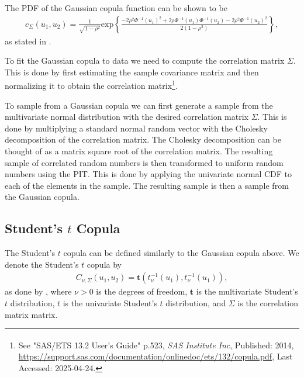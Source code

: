 \documentclass[%
a4paper,							
11pt,								
bibliography=totoc,						
abstracton=true					
]
{scrartcl}
\theoremstyle{plain}
\theoremstyle{definition}
\theoremstyle{remark}
\newcommand{\1}{\mathbbm{1}}
\begin{document}
The \gls{PDF} of the Gaussian copula function can be shown to be 
\begin{align*}
     c_{\Sigma} (u_1,u_2)
    = \frac{1}{\sqrt{1-\rho^2}} \mathrm{exp}\left\{  \frac{-2\rho^2\Phi^{-1}(u_1)^2  +2\rho \Phi^{-1}(u_1)\Phi^{-1}(u_2) -2\rho^2\Phi^{-1}(u_2)^2}{2(1-\rho^2)}   \right\},
\end{align*}
as stated in \citet[p.267]{Alexander2008}.



To fit the Gaussian copula to data we need to compute the correlation matrix $\Sigma$. This is done by first estimating the sample covariance matrix and then normalizing it to obtain the correlation matrix\footnote{See "SAS/ETS\textsuperscript{\textregistered} 13.2 User's Guide" p.523, \textit{SAS Institute Inc}, Published: 2014, \url{https://support.sas.com/documentation/onlinedoc/ets/132/copula.pdf}, Last Accessed: 2025-04-24.}.%

To sample from a Gaussian copula we can first generate a sample from the multivariate normal distribution with the desired correlation matrix $\Sigma$. This is done by multiplying a standard normal random vector with the Cholesky decomposition of the correlation matrix. The Cholesky decomposition can be thought of as a matrix square root of the correlation matrix. The resulting sample of correlated random numbers is then transformed to uniform random numbers using the \gls{PIT}. This is done by applying the univariate normal \gls{CDF} to each of the elements in the sample. The resulting sample is then a sample from the Gaussian copula\footnotemark[\value{footnote}]. %



\subsection{Student's $t$ Copula}\label{sec:StudentsCopula} 
The Student's $t$ copula can be defined similarly to the Gaussian copula above. We denote the Student's $t$ copula by 
\begin{align*}
    C_{\nu,\Sigma}(u_1,u_2) = \boldsymbol{t}(t_\nu^{-1}(u_1),t_\nu^{-1}(u_1)),
\end{align*}
as done by , where $\nu >0$ is the degrees of freedom, $\boldsymbol{t}$ is the multivariate Student's $t$ distribution, $t$ is the univariate Student's $t$ distribution, and $\Sigma$ is the correlation matrix matrix.
\end{document}
